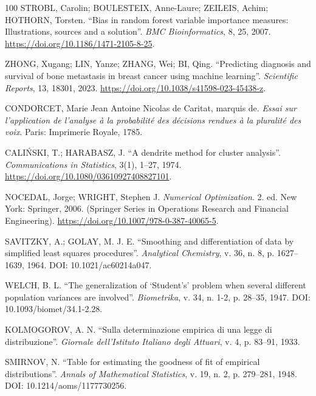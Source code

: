\documentclass[msc]{on} %
\begin{document}
\begin{thebibliography}{100}
 STROBL, Carolin; BOULESTEIX, Anne-Laure; ZEILEIS, Achim; HOTHORN, Torsten. ``Bias in random forest variable importance measures: Illustrations, sources and a solution''. \emph{BMC Bioinformatics}, 8, 25, 2007. \url{https://doi.org/10.1186/1471-2105-8-25}.

 ZHONG, Xugang; LIN, Yanze; ZHANG, Wei; BI, Qing. ``Predicting diagnosis and survival of bone metastasis in breast cancer using machine learning''. \emph{Scientific Reports}, 13, 18301, 2023. \url{https://doi.org/10.1038/s41598-023-45438-z}.

 CONDORCET, Marie Jean Antoine Nicolas de Caritat, marquis de. \textit{Essai sur l'application de l'analyse à la probabilité des décisions rendues à la pluralité des voix}. Paris: Imprimerie Royale, 1785.

 CALI\'{N}SKI, T.; HARABASZ, J. ``A dendrite method for cluster analysis''. \emph{Communications in Statistics}, 3(1), 1--27, 1974. \url{https://doi.org/10.1080/03610927408827101}.

 NOCEDAL, Jorge; WRIGHT, Stephen J. \textit{Numerical Optimization}. 2. ed. New York: Springer, 2006. (Springer Series in Operations Research and Financial Engineering). \url{https://doi.org/10.1007/978-0-387-40065-5}.

 SAVITZKY, A.; GOLAY, M. J. E. ``Smoothing and differentiation of data by simplified least squares procedures''. \emph{Analytical Chemistry}, v. 36, n. 8, p. 1627--1639, 1964. DOI: 10.1021/ac60214a047.

 WELCH, B. L. ``The generalization of `Student's' problem when several different population variances are involved''. \emph{Biometrika}, v. 34, n. 1-2, p. 28--35, 1947. DOI: 10.1093/biomet/34.1-2.28.

 KOLMOGOROV, A. N. ``Sulla determinazione empirica di una legge di distribuzione''. \emph{Giornale dell'Istituto Italiano degli Attuari}, v. 4, p. 83--91, 1933.

 SMIRNOV, N. ``Table for estimating the goodness of fit of empirical distributions''. \emph{Annals of Mathematical Statistics}, v. 19, n. 2, p. 279--281, 1948. DOI: 10.1214/aoms/1177730256.


\end{thebibliography}
\end{document}
